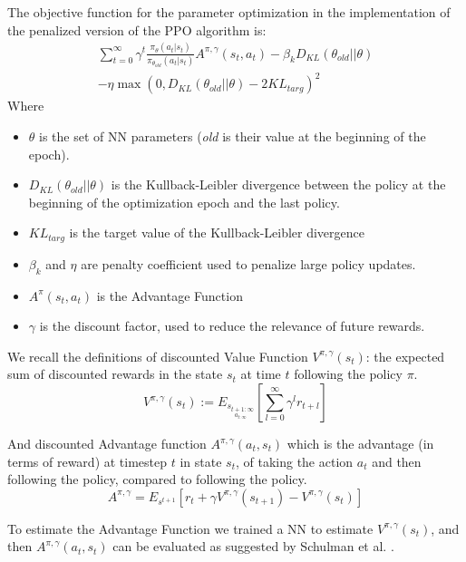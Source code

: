 \documentclass{sig-alternate-05-2015}
\begin{document}
The objective function for the parameter optimization in the implementation of the penalized version of the PPO algorithm \cite{Heess2017} is:
\begin{align*}
       \sum_{t=0}^\infty\gamma^t\frac{\pi_{\theta}(a_t|s_t)}{\pi_{\theta_{old}}(a_t|s_t)}
       A^{\pi, \gamma}(s_t,a_t)  -\beta_kD_{KL}(\theta_{old}||\theta) \\
        -\eta \max(0, D_{KL}(\theta_{old}||\theta) - 2KL_{targ})^2
\end{align*}
Where 
\begin{itemize}
    \item $\theta$ is the set of NN parameters (\emph{old} is their value at the beginning of the epoch). 
    \item $D_{KL}(\theta_{old}||\theta)$ is the Kullback-Leibler divergence between the policy at the beginning of the optimization epoch and the last policy.
    \item $KL_{targ}$ is the target value of the Kullback-Leibler divergence
    \item $\beta_k$ and $\eta$ are penalty coefficient used to penalize large policy updates.
    \item $A^\pi(s_t,a_t)$ is the Advantage Function
    \item $\gamma$ is the discount factor, used to reduce the relevance of future rewards.
\end{itemize}
We recall the definitions of discounted Value Function $V^{\pi, \gamma}(s_t)$: the expected sum of discounted rewards in the state $s_t$ at time $t$ following the policy $\pi$. 
\begin{equation}\label{eq_ValueFunc}
    V^{\pi, \gamma}(s_t) := E_{\underset{a_{t:\infty}}{s_{t+1:\infty}}}
    \left[\sum_{l=0}^\infty \gamma^l r_{t+l}\right]
\end{equation}

And discounted Advantage function  $A^{\pi, \gamma}(a_t,s_t)$ which is the advantage (in terms of reward) at timestep $t$ in state $s_t$, of taking the action $a_t$ and then following the policy, compared to following the policy.
\begin{equation} \label{eq:AdvFunc}
    A^{\pi, \gamma} = E_{s^{t+1}}\left[r_t+\gamma V^{\pi,\gamma}(s_{t+1})- V^{\pi,\gamma}(s_t)\right]
\end{equation}

To estimate the Advantage Function we trained a NN to estimate $V^{\pi, \gamma}(s_t)$, and then $A^{\pi, \gamma}(a_t,s_t)$ can be evaluated as suggested by Schulman et al. \cite{Schulman15GAE}.
\end{document}
